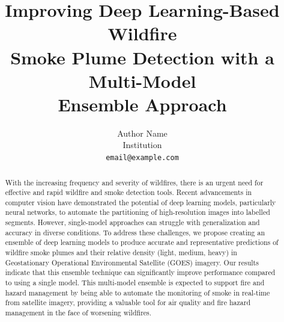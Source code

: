 \documentclass{article}
\title{Improving Deep Learning-Based Wildfire\\ Smoke Plume Detection with a Multi-Model\\ Ensemble Approach}
\author{Author Name \\
Institution \\
\texttt{email@example.com}
}
\begin{document}
\maketitle


\begin{abstract}
With the increasing frequency and severity of wildfires, there is an urgent need for effective and rapid wildfire and smoke detection tools. Recent advancements in computer vision have demonstrated the potential of deep learning models, particularly neural networks, to automate the partitioning of high-resolution images into labelled segments. However, single-model approaches can struggle with generalization and accuracy in diverse conditions. To address these challenges, we propose creating an ensemble of deep learning models to produce accurate and representative predictions of wildfire smoke plumes and their relative density (light, medium, heavy) in Geostationary Operational Environmental Satellite (GOES) imagery. Our results indicate that this ensemble technique can significantly improve performance compared to using a single model. This multi-model ensemble is expected to support fire and hazard management by being able to automate the monitoring of smoke in real-time from satellite imagery, providing a valuable tool for air quality and fire hazard management in the face of worsening wildfires.
\end{abstract}
\end{document}
